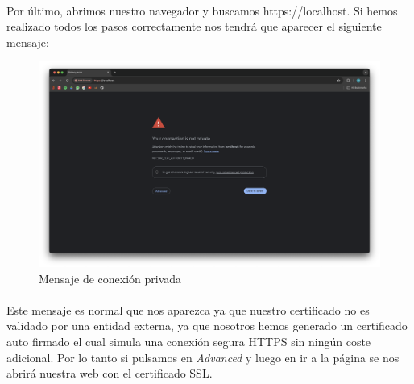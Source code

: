\paragraph{}
Por último, abrimos nuestro navegador y buscamos https://localhost. Si hemos realizado todos los pasos correctamente nos tendrá que aparecer el siguiente mensaje: 
\begin{figure}[h]
    \centering
    \includegraphics[width=1\linewidth]{conNotPrivate.png}
    \caption{Mensaje de conexión privada}
\end{figure}
\paragraph{}
Este mensaje es normal que nos aparezca ya que nuestro certificado no es validado por una entidad externa, ya que nosotros hemos generado un certificado auto firmado el cual simula una conexión segura HTTPS sin ningún coste adicional. Por lo tanto si pulsamos en \textit{Advanced} y luego en ir a la página se nos abrirá nuestra web con el certificado SSL.

